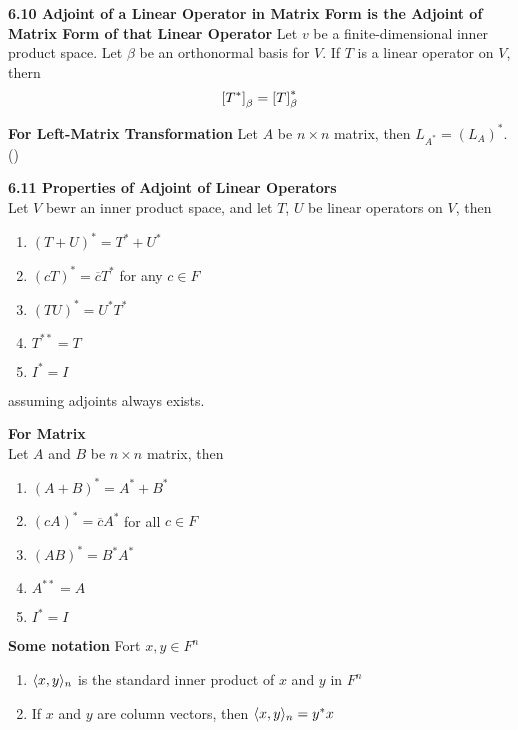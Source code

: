 \documentclass[11pt]{article}
\begin{document}
\begin{theorem*}
    \textbf{6.10 Adjoint of a Linear Operator in Matrix Form is the Adjoint of Matrix Form of that Linear Operator} Let $v$ be a finite-dimensional inner product space. Let $\beta$ be an orthonormal basis for $V$. If $T$ is a linear operator on $V$, thern 
    \[
        \left[ T^* \right]_{\beta} = \left[ T \right]_{\beta}^*
    \]
\end{theorem*}

\begin{corollary*}
    \textbf{For Left-Matrix Transformation} Let $A$ be $n\times n$ matrix, then $L_{A^*} = (L_A)^*$. ()
\end{corollary*}

\begin{theorem*}
    \textbf{6.11 Properties of Adjoint of Linear Operators} \\
    Let $V$ bewr an inner product space, and let $T$, $U$ be linear operators on $V$, then 
    \begin{enumerate}
        \item $(T+U)^* = T^* + U^*$ 
        \item $(cT)^* = \overline{c}T^*$ for any $c\in F$
        \item $(TU)^* = U^*T^*$ 
        \item $T^{**} = T$ 
        \item $I^* = I$ 
    \end{enumerate}
    assuming adjoints always exists.
\end{theorem*}

\begin{corollary*}
    \textbf{For Matrix} \\
    Let $A$ and $B$ be $n\times n$ matrix, then 
    \begin{enumerate}
        \item $(A+B)^* = A^* + B^*$ 
        \item $(cA)^* = \overline{c}A^*$ for all $c\in F$
        \item $(AB)^* = B^*A^*$ 
        \item $A^{**} = A$ 
        \item $I^* = I$ 
    \end{enumerate}
\end{corollary*}


\begin{defn*}
    \textbf{Some notation} Fort $x,y\in F^n$ 
    \begin{enumerate}
        \item $\langle x,y\rangle_n$ is the standard inner product of $x$ and $y$  in $F^n$
        \item If $x$ and $y$ are column vectors, then $\langle x,y\rangle_n = y^*x$ 
    \end{enumerate}
\end{defn*}
\end{document}
